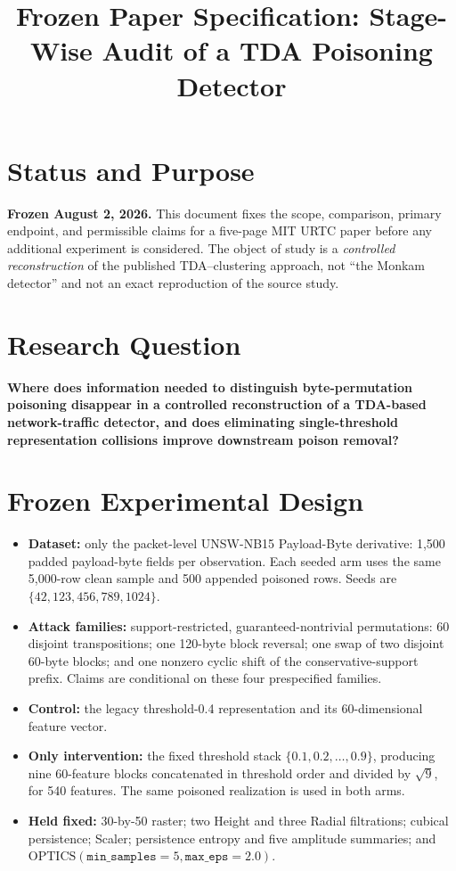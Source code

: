 \documentclass[conference]{IEEEtran}
\title{Frozen Paper Specification: Stage-Wise Audit of a TDA Poisoning Detector}
\author{\IEEEauthorblockN{Christian Dane Beels}
\IEEEauthorblockA{Department of Mathematical Sciences\\
United States Military Academy\\
West Point, New York}}
\begin{document}
\maketitle

\section*{Status and Purpose}
\textbf{Frozen August 2, 2026.} This document fixes the scope, comparison,
primary endpoint, and permissible claims for a five-page MIT URTC paper before
any additional experiment is considered. The object of study is a
\emph{controlled reconstruction} of the published TDA--clustering approach,
not ``the Monkam detector'' and not an exact reproduction of the source study.

\section*{Research Question}
\textbf{Where does information needed to distinguish byte-permutation
poisoning disappear in a controlled reconstruction of a TDA-based
network-traffic detector, and does eliminating single-threshold representation
collisions improve downstream poison removal?}

\section*{Frozen Experimental Design}
\begin{itemize}[leftmargin=*,nosep]
  \item \textbf{Dataset:} only the packet-level UNSW-NB15 Payload-Byte
  derivative: 1,500 padded payload-byte fields per observation. Each seeded
  arm uses the same 5,000-row clean sample and 500 appended poisoned rows.
  Seeds are \(\{42,123,456,789,1024\}\).
  \item \textbf{Attack families:} support-restricted, guaranteed-nontrivial
  permutations: 60 disjoint transpositions; one 120-byte block reversal; one
  swap of two disjoint 60-byte blocks; and one nonzero cyclic shift of the
  conservative-support prefix. Claims are conditional on these four
  prespecified families.
  \item \textbf{Control:} the legacy threshold-0.4 representation and its
  60-dimensional feature vector.
  \item \textbf{Only intervention:} the fixed threshold stack
  \(\{0.1,0.2,\ldots,0.9\}\), producing nine 60-feature blocks concatenated in
  threshold order and divided by \(\sqrt{9}\), for 540 features. The same
  poisoned realization is used in both arms.
  \item \textbf{Held fixed:} 30-by-50 raster; two Height and three Radial
  filtrations; cubical persistence; Scaler; persistence entropy and five
  amplitude summaries; and \(\mathrm{OPTICS}(\texttt{min\_samples}=5,
  \texttt{max\_eps}=2.0)\).
\end{itemize}
\end{document}
